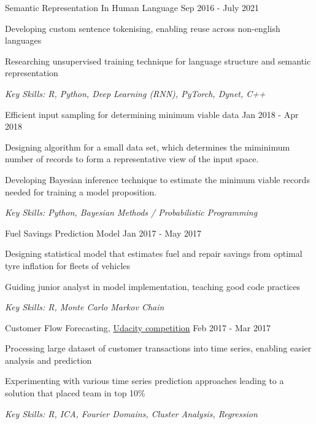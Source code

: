 \documentclass[11pt,article,oneside]{memoir}
\newenvironment{itemize*}{%
  \renewcommand\labelitemi{\textbullet}
  \footnotesize
  \begin{itemize}%
    \setlength{\itemsep}{0pt}}%
  {\end{itemize}
}
\begin{document}
\normalsize
\medskip
\ind Semantic Representation In Human Language \hfill Sep 2016 - July 2021
\begin{itemize*}
  \item Developing custom sentence tokenising, enabling reuse across non-english languages
  \item Researching unsupervised training technique for language structure and semantic representation
\end{itemize*}
\ind \hspace{0.35in} \footnotesize \emph{Key Skills: R, Python, Deep Learning (RNN), PyTorch, Dynet, C++}

\normalsize
\medskip
\ind Efficient input sampling for determining minimum viable data \hfill Jan 2018 - Apr 2018
\begin{itemize*}
  \item Designing algorithm for a small data set, which determines the miminimum number of records to form a representative view of the input space.
  \item Developing Bayesian inference technique to estimate the minimum viable records needed for training a model proposition.
\end{itemize*}
\ind \hspace{0.35in} \footnotesize \emph{Key Skills: Python, Bayesian Methods / Probabilistic Programming}

\normalsize
\medskip
\ind Fuel Savings Prediction Model \hfill Jan 2017 - May 2017
\begin{itemize*}
  \item Designing statistical model that estimates fuel and repair savings from optimal tyre inflation for fleets of vehicles
  \item Guiding junior analyst in model implementation, teaching good code practices
\end{itemize*}
\ind \hspace{0.35in} \footnotesize \emph{Key Skills: R, Monte Carlo Markov Chain}

\normalsize
\medskip
\ind Customer Flow Forecasting, \href{https://blog.udacity.com/2017/01/data-science-enthusiasts-win-10000.html}{Udacity competition} \hfill Feb 2017 - Mar 2017
\begin{itemize*}
  \item Processing large dataset of customer transactions into time series, enabling easier analysis and prediction  
  \item Experimenting with various time series prediction approaches leading to a solution that placed team in top 10\%
\end{itemize*}
\ind \hspace{0.35in} \footnotesize \emph{Key Skills: R, ICA, Fourier Domains, Cluster Analysis, Regression}
\end{document}
